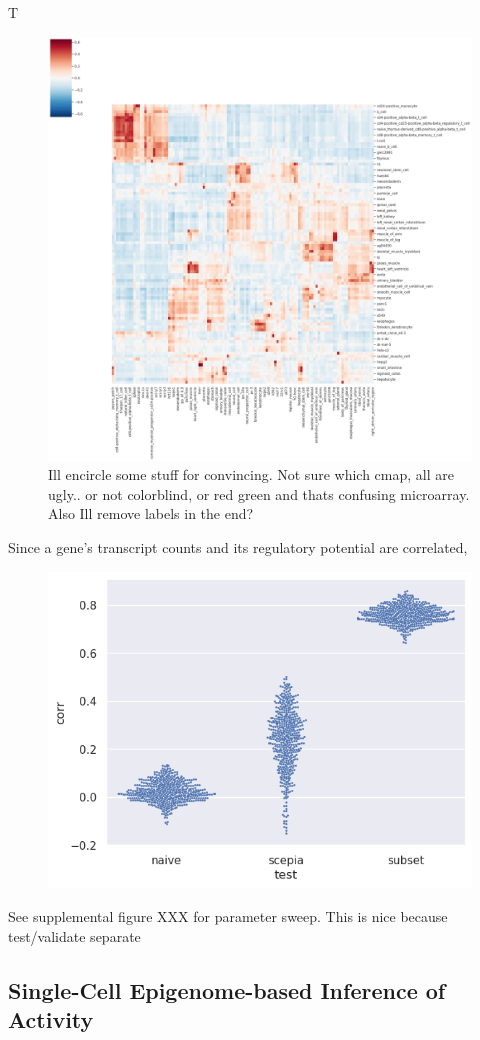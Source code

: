 T
\begin{figure}
    \centering
    \includegraphics[width=0.75\linewidth]{ch.scepia/imgs/celltypes.png}
    \caption{Ill encircle some stuff for convincing. Not sure which cmap, all are ugly.. or not colorblind, or red green and thats confusing microarray. Also Ill remove labels in the end?}
    \label{fig:enter-label}
\end{figure}
Since a gene's transcript counts and its regulatory potential are correlated, 
\begin{figure}
    \centering
    \includegraphics[width=0.75\linewidth]{ch.scepia/imgs/scepia_bulk_benchmark.png}
    \caption{}
    \label{fig:enter-label}
\end{figure}
See supplemental figure XXX for parameter sweep. This is nice because test/validate separate

\subsection{Single-Cell Epigenome-based Inference of Activity}

